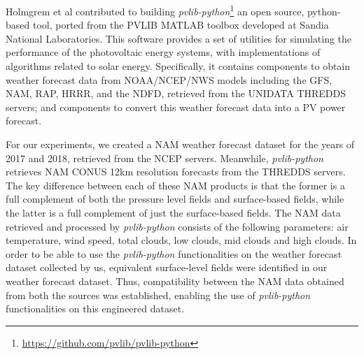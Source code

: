 Holmgrem et al \cite{pvlib_Holmgren2018} contributed to building \textit{pvlib-python}\footnote{\url{https://github.com/pvlib/pvlib-python}} an open source, python-based tool, ported from the PVLIB MATLAB toolbox developed at Sandia National Laboratories. This software provides a set of utilities for simulating the performance of the photovoltaic energy systems, with implementations of algorithms related to solar energy. Specifically, it contains components to obtain weather forecast data from NOAA/NCEP/NWS models including the GFS, NAM, RAP, HRRR, and the NDFD, retrieved from the UNIDATA THREDDS servers; and components to convert this weather forecast data into a PV power forecast. 

\par For our experiments, we created a NAM weather forecast dataset for the years of 2017 and 2018, retrieved from the NCEP servers. Meanwhile, \textit{pvlib-python} retrieves NAM CONUS 12km resolution forecasts from the THREDDS servers. The key difference between each of these NAM products is that the former is a full complement of both the pressure level fields and surface-based fields, while the latter is a full complement of just the surface-based fields. The NAM data retrieved and processed by \textit{pvlib-python} consists of the following parameters: air temperature, wind speed, total clouds, low clouds, mid clouds and high clouds. In order to be able to use the \textit{pvlib-python} functionalities on the weather forecast dataset collected by us, equivalent surface-level fields were identified in our weather forecast dataset. Thus, compatibility between the NAM data obtained from both the sources was established, enabling the use of \textit{pvlib-python} functionalities on this engineered dataset.

